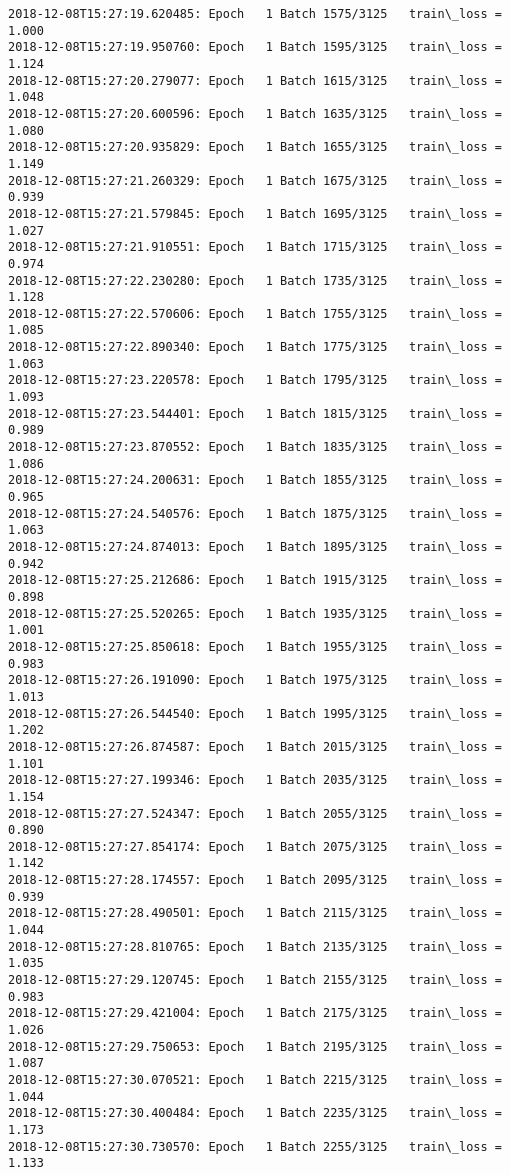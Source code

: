 \documentclass[11pt]{article}
\begin{document}
\begin{Verbatim}[commandchars=\\\{\}]
2018-12-08T15:27:19.620485: Epoch   1 Batch 1575/3125   train\_loss = 1.000
2018-12-08T15:27:19.950760: Epoch   1 Batch 1595/3125   train\_loss = 1.124
2018-12-08T15:27:20.279077: Epoch   1 Batch 1615/3125   train\_loss = 1.048
2018-12-08T15:27:20.600596: Epoch   1 Batch 1635/3125   train\_loss = 1.080
2018-12-08T15:27:20.935829: Epoch   1 Batch 1655/3125   train\_loss = 1.149
2018-12-08T15:27:21.260329: Epoch   1 Batch 1675/3125   train\_loss = 0.939
2018-12-08T15:27:21.579845: Epoch   1 Batch 1695/3125   train\_loss = 1.027
2018-12-08T15:27:21.910551: Epoch   1 Batch 1715/3125   train\_loss = 0.974
2018-12-08T15:27:22.230280: Epoch   1 Batch 1735/3125   train\_loss = 1.128
2018-12-08T15:27:22.570606: Epoch   1 Batch 1755/3125   train\_loss = 1.085
2018-12-08T15:27:22.890340: Epoch   1 Batch 1775/3125   train\_loss = 1.063
2018-12-08T15:27:23.220578: Epoch   1 Batch 1795/3125   train\_loss = 1.093
2018-12-08T15:27:23.544401: Epoch   1 Batch 1815/3125   train\_loss = 0.989
2018-12-08T15:27:23.870552: Epoch   1 Batch 1835/3125   train\_loss = 1.086
2018-12-08T15:27:24.200631: Epoch   1 Batch 1855/3125   train\_loss = 0.965
2018-12-08T15:27:24.540576: Epoch   1 Batch 1875/3125   train\_loss = 1.063
2018-12-08T15:27:24.874013: Epoch   1 Batch 1895/3125   train\_loss = 0.942
2018-12-08T15:27:25.212686: Epoch   1 Batch 1915/3125   train\_loss = 0.898
2018-12-08T15:27:25.520265: Epoch   1 Batch 1935/3125   train\_loss = 1.001
2018-12-08T15:27:25.850618: Epoch   1 Batch 1955/3125   train\_loss = 0.983
2018-12-08T15:27:26.191090: Epoch   1 Batch 1975/3125   train\_loss = 1.013
2018-12-08T15:27:26.544540: Epoch   1 Batch 1995/3125   train\_loss = 1.202
2018-12-08T15:27:26.874587: Epoch   1 Batch 2015/3125   train\_loss = 1.101
2018-12-08T15:27:27.199346: Epoch   1 Batch 2035/3125   train\_loss = 1.154
2018-12-08T15:27:27.524347: Epoch   1 Batch 2055/3125   train\_loss = 0.890
2018-12-08T15:27:27.854174: Epoch   1 Batch 2075/3125   train\_loss = 1.142
2018-12-08T15:27:28.174557: Epoch   1 Batch 2095/3125   train\_loss = 0.939
2018-12-08T15:27:28.490501: Epoch   1 Batch 2115/3125   train\_loss = 1.044
2018-12-08T15:27:28.810765: Epoch   1 Batch 2135/3125   train\_loss = 1.035
2018-12-08T15:27:29.120745: Epoch   1 Batch 2155/3125   train\_loss = 0.983
2018-12-08T15:27:29.421004: Epoch   1 Batch 2175/3125   train\_loss = 1.026
2018-12-08T15:27:29.750653: Epoch   1 Batch 2195/3125   train\_loss = 1.087
2018-12-08T15:27:30.070521: Epoch   1 Batch 2215/3125   train\_loss = 1.044
2018-12-08T15:27:30.400484: Epoch   1 Batch 2235/3125   train\_loss = 1.173
2018-12-08T15:27:30.730570: Epoch   1 Batch 2255/3125   train\_loss = 1.133

\end{Verbatim}
\end{document}
